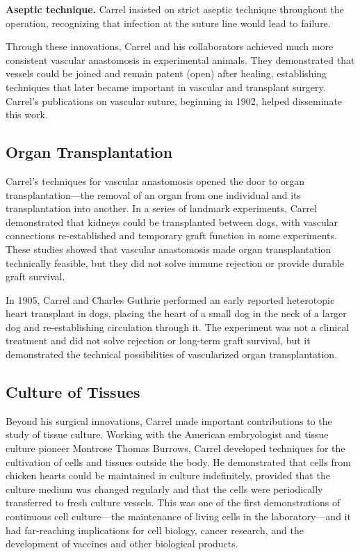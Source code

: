 \textbf{Aseptic technique.} Carrel insisted on strict aseptic technique throughout the operation, recognizing that infection at the suture line would lead to failure.

Through these innovations, Carrel and his collaborators achieved much more consistent vascular anastomosis in experimental animals. They demonstrated that vessels could be joined and remain patent (open) after healing, establishing techniques that later became important in vascular and transplant surgery. Carrel's publications on vascular suture, beginning in 1902, helped disseminate this work.\cite{lecture-1912,carrel-history}

\subsection{Organ Transplantation}

Carrel's techniques for vascular anastomosis opened the door to organ transplantation---the removal of an organ from one individual and its transplantation into another. In a series of landmark experiments, Carrel demonstrated that kidneys could be transplanted between dogs, with vascular connections re-established and temporary graft function in some experiments. These studies showed that vascular anastomosis made organ transplantation technically feasible, but they did not solve immune rejection or provide durable graft survival.

In 1905, Carrel and Charles Guthrie performed an early reported heterotopic heart transplant in dogs, placing the heart of a small dog in the neck of a larger dog and re-establishing circulation through it. The experiment was not a clinical treatment and did not solve rejection or long-term graft survival, but it demonstrated the technical possibilities of vascularized organ transplantation.\cite{carrel-heart}

\subsection{Culture of Tissues}

Beyond his surgical innovations, Carrel made important contributions to the study of tissue culture. Working with the American embryologist and tissue culture pioneer Montrose Thomas Burrows, Carrel developed techniques for the cultivation of cells and tissues outside the body. He demonstrated that cells from chicken hearts could be maintained in culture indefinitely, provided that the culture medium was changed regularly and that the cells were periodically transferred to fresh culture vessels. This was one of the first demonstrations of continuous cell culture---the maintenance of living cells in the laboratory---and it had far-reaching implications for cell biology, cancer research, and the development of vaccines and other biological products.

